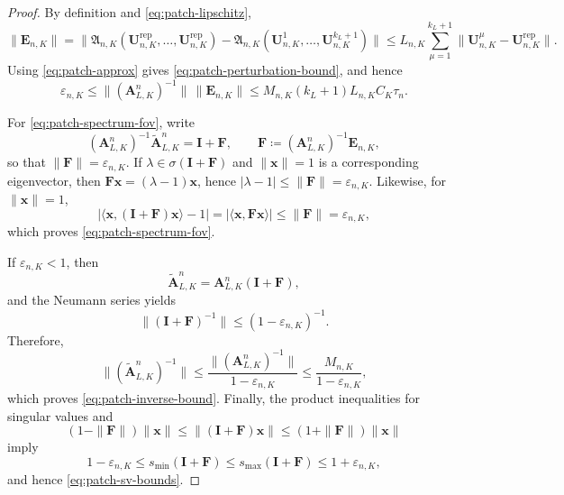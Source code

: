 \documentclass[10pt,a4paper]{amsart}
\begin{document}
\begin{proof}
By definition and \eqref{eq:patch-lipschitz},
\[
  \|\bm E_{n,K}\|
  =
  \|\mathfrak A_{n,K}(\bm U_{n,K}^{\mathrm{rep}},\dots,\bm U_{n,K}^{\mathrm{rep}})
   -\mathfrak A_{n,K}(\bm U_{n,K}^{1},\dots,\bm U_{n,K}^{k_L+1})\|
  \le
  L_{n,K}\sum_{\mu=1}^{k_L+1}
  \|\bm U_{n,K}^\mu-\bm U_{n,K}^{\mathrm{rep}}\|.
\]
Using \eqref{eq:patch-approx} gives \eqref{eq:patch-perturbation-bound}, and
hence
\[
  \varepsilon_{n,K}
  \le \|(\bm A_{L,K}^n)^{-1}\|\,\|\bm E_{n,K}\|
  \le M_{n,K}(k_L+1)L_{n,K}C_K\tau_n.
\]

For \eqref{eq:patch-spectrum-fov}, write
\[
  (\bm A_{L,K}^n)^{-1}\tilde{\bm A}_{L,K}^n
  = \bm I+\bm F,
  \qquad
  \bm F\coloneq (\bm A_{L,K}^n)^{-1}\bm E_{n,K},
\]
so that \(\|\bm F\|=\varepsilon_{n,K}\). If
\(\lambda\in \sigma(\bm I+\bm F)\) and \(\|\bm x\|=1\) is a corresponding
eigenvector, then \(\bm F\bm x=(\lambda-1)\bm x\), hence
\(|\lambda-1|\le \|\bm F\|=\varepsilon_{n,K}\). Likewise, for
\(\|\bm x\|=1\),
\[
  |\langle \bm x,(\bm I+\bm F)\bm x\rangle-1|
  = |\langle \bm x,\bm F\bm x\rangle|
  \le \|\bm F\|
  = \varepsilon_{n,K},
\]
which proves \eqref{eq:patch-spectrum-fov}.

If \(\varepsilon_{n,K}<1\), then
\[
  \tilde{\bm A}_{L,K}^n
  = \bm A_{L,K}^n(\bm I+\bm F),
\]
and the Neumann series yields
\[
  \|(\bm I+\bm F)^{-1}\|\le (1-\varepsilon_{n,K})^{-1}.
\]
Therefore,
\[
  \|(\tilde{\bm A}_{L,K}^n)^{-1}\|
  \le
  \frac{\|(\bm A_{L,K}^n)^{-1}\|}{1-\varepsilon_{n,K}}
  \le
  \frac{M_{n,K}}{1-\varepsilon_{n,K}},
\]
which proves \eqref{eq:patch-inverse-bound}. Finally, the product inequalities
for singular values and
\[
  (1-\|\bm F\|)\|\bm x\|
  \le \|(\bm I+\bm F)\bm x\|
  \le (1+\|\bm F\|)\|\bm x\|
\]
imply
\[
  1-\varepsilon_{n,K}\le s_{\min}(\bm I+\bm F)
  \le s_{\max}(\bm I+\bm F)\le 1+\varepsilon_{n,K},
\]
and hence \eqref{eq:patch-sv-bounds}.
\end{proof}
\end{document}
